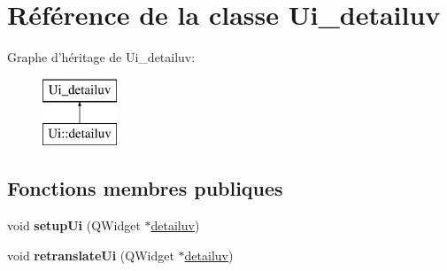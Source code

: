 \hypertarget{class_ui__detailuv}{\section{Référence de la classe Ui\+\_\+detailuv}
\label{class_ui__detailuv}
}
Graphe d'héritage de Ui\+\_\+detailuv\+:\begin{figure}[H]
\begin{center}
\leavevmode
\includegraphics[height=2.000000cm]{class_ui__detailuv}
\end{center}
\end{figure}
\subsection*{Fonctions membres publiques}
\begin{DoxyCompactItemize}
\item 
\hypertarget{class_ui__detailuv_ac10a5ecc791bc18309ffda5d67470e40}{void {\bfseries setup\+Ui} (Q\+Widget $\ast$\hyperlink{classdetailuv}{detailuv})}\label{class_ui__detailuv_ac10a5ecc791bc18309ffda5d67470e40}

\item 
\hypertarget{class_ui__detailuv_a2b4b9e96634a500527d26c3a501bfd33}{void {\bfseries retranslate\+Ui} (Q\+Widget $\ast$\hyperlink{classdetailuv}{detailuv})}\label{class_ui__detailuv_a2b4b9e96634a500527d26c3a501bfd33}

\end{DoxyCompactItemize}
